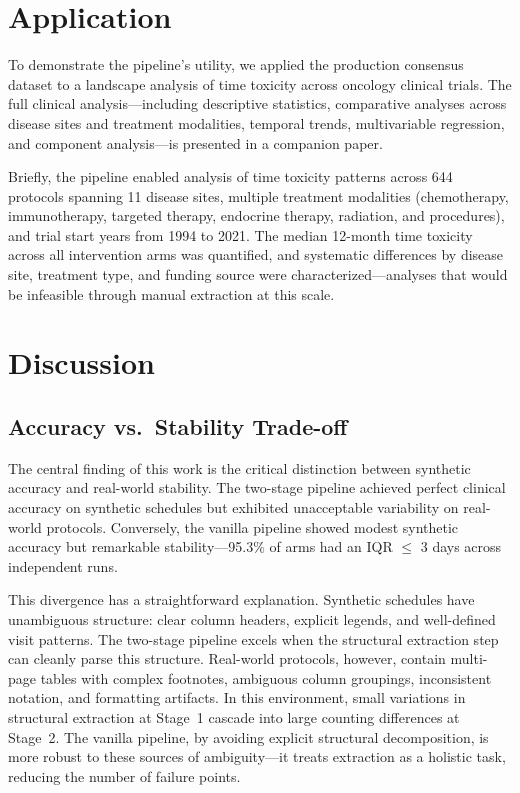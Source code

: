 \documentclass[11pt]{article}
\begin{document}
\section{Application}

To demonstrate the pipeline's utility, we applied the production consensus dataset to a landscape analysis of time toxicity across oncology clinical trials. The full clinical analysis---including descriptive statistics, comparative analyses across disease sites and treatment modalities, temporal trends, multivariable regression, and component analysis---is presented in a companion paper.

Briefly, the pipeline enabled analysis of time toxicity patterns across 644 protocols spanning 11 disease sites, multiple treatment modalities (chemotherapy, immunotherapy, targeted therapy, endocrine therapy, radiation, and procedures), and trial start years from 1994 to 2021. The median 12-month time toxicity across all intervention arms was quantified, and systematic differences by disease site, treatment type, and funding source were characterized---analyses that would be infeasible through manual extraction at this scale.

\section{Discussion}

\subsection{Accuracy vs.\ Stability Trade-off}

The central finding of this work is the critical distinction between synthetic accuracy and real-world stability. The two-stage pipeline achieved perfect clinical accuracy on synthetic schedules but exhibited unacceptable variability on real-world protocols. Conversely, the vanilla pipeline showed modest synthetic accuracy but remarkable stability---95.3\% of arms had an IQR $\leq$ 3 days across independent runs.

This divergence has a straightforward explanation. Synthetic schedules have unambiguous structure: clear column headers, explicit legends, and well-defined visit patterns. The two-stage pipeline excels when the structural extraction step can cleanly parse this structure. Real-world protocols, however, contain multi-page tables with complex footnotes, ambiguous column groupings, inconsistent notation, and formatting artifacts. In this environment, small variations in structural extraction at Stage~1 cascade into large counting differences at Stage~2. The vanilla pipeline, by avoiding explicit structural decomposition, is more robust to these sources of ambiguity---it treats extraction as a holistic task, reducing the number of failure points.
\end{document}

